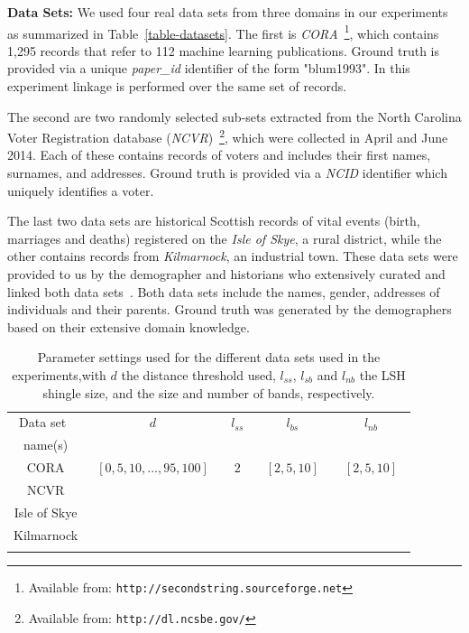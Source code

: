 \documentclass{llncs}
\begin{document}
\smallskip
\textbf{Data Sets:}
We used four real data sets from three domains in our experiments as
summarized in Table~\ref{table-datasets}. The first is
\emph{CORA}~\footnote{Available from:
\texttt{http://secondstring.sourceforge.net}}, which contains 1,295
records that refer to 112 machine learning publications. Ground truth is provided via a unique
\emph{paper\_id} identifier of the form "blum1993". In this experiment linkage is performed over the same set of records.

The second are two randomly selected sub-sets extracted from the North Carolina Voter Registration
database (\emph{NCVR})~\footnote{Available from: \texttt{http://dl.ncsbe.gov/}}, which were collected in April and June
2014. Each of these contains records of voters and includes their
first names, surnames, and addresses. Ground truth is provided via a
\emph{NCID} identifier which uniquely identifies a voter.

The last two data sets are historical Scottish records of vital
events (birth, marriages and deaths) registered on the
\emph{Isle of Skye}, a rural district, while the other contains
records from \emph{Kilmarnock}, an industrial town. These data sets
were provided to us by the demographer and historians who extensively
curated and linked both data sets~\cite{reid2002,reid2006}. Both data
sets include the  names, gender, addresses of individuals and their
parents. Ground truth was generated by the demographers based on their
extensive domain knowledge.


\begin{table}[t]
\caption{Parameter settings used for the different data sets used in
   the experiments,with $d$ the distance threshold used, $l_{ss}$, $l_{sb}$ and $l_{nb}$ the LSH
   shingle size, and the size and number of bands, respectively.}
 \label{table-parameters}
  \centering
  \begin{scriptsize}
  \begin{tabular}{ccccc}
  \hline\noalign{\smallskip}
  Data set~ & $d$ & $l_{ss}$ & $l_{bs}$ & $l_{nb}$ \\
  name(s) & & & &  \\
  \noalign{\smallskip} \hline \noalign{\smallskip}
  CORA & ~$[0,5,10,\ldots,95,100]$~ & ~$2$~ &
    ~$[2,5,10]$~ & ~$[2,5,10]$~  \\
  NCVR  &  \\
  Isle of Skye &  \\
  Kilmarnock  &  \\
  \noalign{\smallskip} \hline
  \end{tabular}
  \end{scriptsize}
\end{table}
\end{document}
